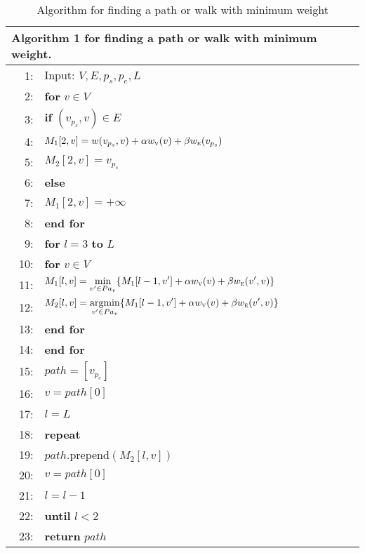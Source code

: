 \begin{table}
\centering
\small
\begin{tabular}{rl}
\hline
\multicolumn{2}{l}{\textbf{Algorithm 1} for finding a path or walk with minimum weight.} \\
\hline
 1:& Input: $V, E, p_s, p_e, L$ \\
 2:&\textbf{for} $v \in V$ \\
 3:&\hspace{6pt}\textbf{if} $(v_{p_s}, v) \in E$ \\
 4:&\hspace{12pt}   $M_1[2, v] = w(v_{p_s}, v) + \alpha w_{\textsc{v}}(v) + \beta w_{\textsc{e}}(v_{p_s})$ \\
 5:&\hspace{12pt}   $M_2[2, v] = v_{p_s}$ \\
 6:&\hspace{6pt}\textbf{else} \\
 7:&\hspace{12pt}   $M_1[2, v] = +\infty$ \\
 8:&\textbf{end for} \\
 9:&\textbf{for} $l=3$ \textbf{to} $L$ \\
10:&\hspace{6pt}\textbf{for} $v \in V$ \\
11:&\hspace{12pt}   \(\displaystyle M_1[l, v] = \min_{v' \in Pa_v} \{ M_1[l-1, v'] + 
                                                \alpha w_{\textsc{v}}(v) + \beta w_{\textsc{e}}(v', v) \} \) \\
12:&\hspace{12pt}   \(\displaystyle M_2[l, v] = \operatorname*{argmin}_{v' \in Pa_v} \{ M_1[l-1, v'] + 
                                                \alpha w_{\textsc{v}}(v) + \beta w_{\textsc{e}}(v', v) \} \)\\
13:&\hspace{6pt}\textbf{end for} \\
14:&\textbf{end for} \\
15:&$path = [v_{p_e}]$ \\
16:&$v = path[0]$ \\
17:&$l = L$ \\
18:&\textbf{repeat} \\
19:&\hspace{6pt}$path$.prepend$(M_2[l, v])$ \\
20:&\hspace{6pt}$v = path[0]$ \\
21:&\hspace{6pt}$l = l - 1$ \\
22:&\textbf{until} $l < 2$ \\
23:&\textbf{return} $path$ \\
\hline
\end{tabular}
    \caption{Algorithm for finding a path or walk with minimum weight}
\label{algo:dp}
\end{table}


